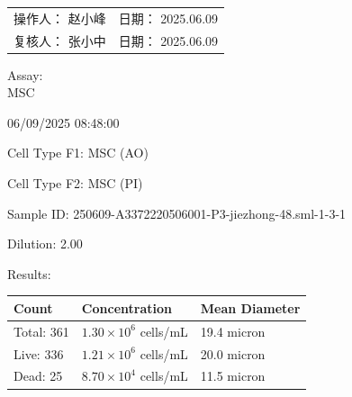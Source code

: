 \documentclass[UTF8,10pt,a4paper,fontset=fandol]{ctexart}
\renewcommand{\arraystretch}{1.15}
\newcommand{\fieldvalue}[1]{#1}
\newcommand{\handwritten}[1]{#1}
\begin{document}
\vfill

\noindent
\begin{tabularx}{\textwidth}{@{}X X@{}}
操作人：
\fieldvalue{\handwritten{赵小峰}}
&
日期：
\fieldvalue{\handwritten{2025.06.09}}
\\[0.8em]
复核人：
\fieldvalue{\handwritten{张小中}}
&
日期：
\fieldvalue{\handwritten{2025.06.09}}
\end{tabularx}

\newpage

\noindent
Assay: \\
\fieldvalue{MSC}

\hfill
\fieldvalue{06/09/2025 08:48:00}

\medskip
\noindent
Cell Type F1: 
\fieldvalue{MSC (AO)}

\medskip
\noindent
Cell Type F2: 
\fieldvalue{MSC (PI)}

\medskip
\noindent
Sample ID: 
\fieldvalue{250609-A3372220506001-P3-jiezhong-48.sml-1-3-1}

\medskip
\noindent
Dilution: 
\fieldvalue{2.00}

\bigskip
\noindent
Results:

\medskip
\renewcommand{\arraystretch}{1.15}
\begin{tabularx}{\textwidth}{@{}l X X@{}}
\textbf{Count} & \textbf{Concentration} & \textbf{Mean Diameter} \\
\hline
Total:
\fieldvalue{361}
&
\fieldvalue{$1.30\times10^{6}$ cells/mL}
&
\fieldvalue{19.4 micron}
\\
Live:
\fieldvalue{336}
&
\fieldvalue{$1.21\times10^{6}$ cells/mL}
&
\fieldvalue{20.0 micron}
\\
Dead:
\fieldvalue{25}
&
\fieldvalue{$8.70\times10^{4}$ cells/mL}
&
\fieldvalue{11.5 micron}
\end{tabularx}
\end{document}
